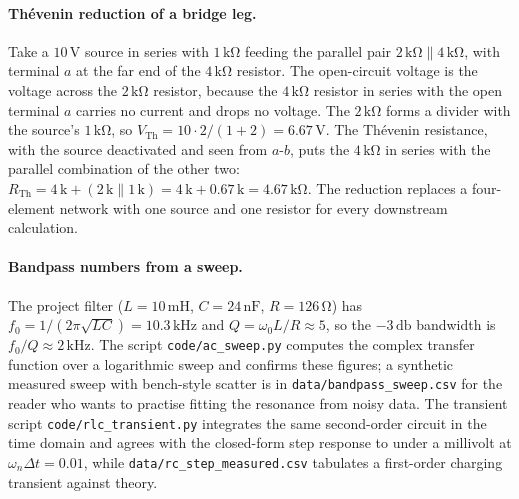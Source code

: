\paragraph{Th\'evenin reduction of a bridge leg.}
Take a $10\,\si{\volt}$ source in series with $1\,\si{\kilo\ohm}$
feeding the parallel pair $2\,\si{\kilo\ohm}\parallel 4\,\si{\kilo
\ohm}$, with terminal $a$ at the far end of the $4\,\si{\kilo\ohm}$
resistor. The open-circuit voltage is the voltage across the
$2\,\si{\kilo\ohm}$ resistor, because the $4\,\si{\kilo\ohm}$ resistor
in series with the open terminal $a$ carries no current and drops no
voltage. The $2\,\si{\kilo\ohm}$ forms a divider with the source's
$1\,\si{\kilo\ohm}$, so $V_{\text{Th}} = 10\cdot 2/(1+2) =
6.67\,\si{\volt}$. The Th\'evenin resistance, with the source
deactivated and seen from $a$-$b$, puts the $4\,\si{\kilo\ohm}$ in
series with the parallel combination of the other two:
$R_{\text{Th}} = 4\,\text{k} + (2\,\text{k}\parallel 1\,\text{k}) =
4\,\text{k}+0.67\,\text{k} = 4.67\,\si{\kilo\ohm}$. The reduction
replaces a four-element network with one source and one resistor for
every downstream calculation.

\paragraph{Bandpass numbers from a sweep.}
The project filter ($L=10\,\si{\milli\henry}$, $C=24\,\si{\nano\farad}$,
$R=126\,\si{\ohm}$) has
$f_{0}=1/(2\pi\sqrt{LC})=10.3\,\si{\kilo\hertz}$ and
$Q=\omega_{0}L/R\approx 5$, so the $-3\,\si{\decibel}$ bandwidth is
$f_{0}/Q\approx 2\,\si{\kilo\hertz}$. The script
\texttt{code/ac\_sweep.py} computes the
complex transfer function over a logarithmic sweep and confirms these
figures; a synthetic measured sweep with bench-style scatter is in
\texttt{data/bandpass\_sweep.csv} for the
reader who wants to practise fitting the resonance from noisy data. The
transient script
\texttt{code/rlc\_transient.py} integrates
the same second-order circuit in the time domain and agrees with the
closed-form step response to under a millivolt at
$\omega_{n}\Delta t = 0.01$, while
\texttt{data/rc\_step\_measured.csv} tabulates
a first-order charging transient against theory.

